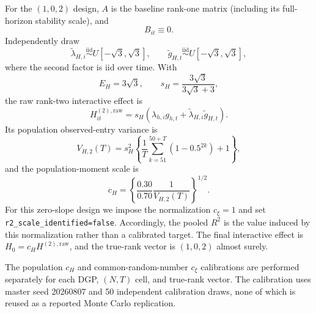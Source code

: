 For the $(1,0,2)$ design, $A$ is the baseline rank-one matrix (including
its full-horizon stability scale), and
\[
 B_{it}\equiv0.
\]
Independently draw
\[
 \widetilde\lambda_{H,i}\stackrel{\mathrm{iid}}{\sim}
 U[-\sqrt{3},\sqrt{3}],\qquad
 \widetilde g_{H,t}\stackrel{\mathrm{iid}}{\sim}
 U[-\sqrt{3},\sqrt{3}],
\]
where the second factor is iid over time.  With
\[
 E_H=3\sqrt{3},\qquad s_H=\frac{3\sqrt{3}}{3\sqrt{3}+3},
\]
the raw rank-two interactive effect is
\[
 H_{it}^{(2),\mathrm{raw}}
 =s_H\left(\lambda_{h,i}g_{h,t}
 +\widetilde\lambda_{H,i}\widetilde g_{H,t}\right).
\]
Its population observed-entry variance is
\[
 V_{H,2}(T)=s_H^2\left\{
 \frac1T\sum_{k=51}^{50+T}(1-0.5^{2k})+1\right\},
\]
and the population-moment scale is
\[
 c_H=\left\{\frac{0.30}{0.70}\frac{1}{V_{H,2}(T)}\right\}^{1/2}.
\]
For this zero-slope design we impose the normalization $c_\xi=1$ and set
\texttt{r2\_scale\_identified=false}.  Accordingly, the pooled
$R^2$ is the value induced by this normalization rather than a calibrated
target.  The final interactive effect is
$H_0=c_HH^{(2),\mathrm{raw}}$, and the true-rank vector is $(1,0,2)$
almost surely.

The population $c_H$ and common-random-number $c_\xi$ calibrations are
performed separately for each DGP, $(N,T)$ cell, and true-rank vector.
The calibration uses master seed 20260807 and 50 independent calibration
draws, none of which is reused as a reported Monte Carlo replication.
